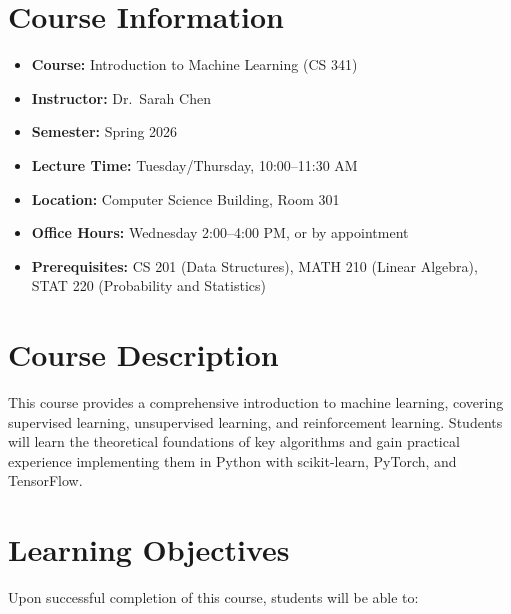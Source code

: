 \documentclass[
    language=english,
    doctype=curriculum,
    institution=none,
]{../../omnilatex}
\begin{document}
\maketitle

\section{Course Information}

\begin{itemize}
    \item \textbf{Course:} Introduction to Machine Learning (CS 341)
    \item \textbf{Instructor:} Dr.\ Sarah Chen
    \item \textbf{Semester:} Spring 2026
    \item \textbf{Lecture Time:} Tuesday/Thursday, 10:00--11:30 AM
    \item \textbf{Location:} Computer Science Building, Room 301
    \item \textbf{Office Hours:} Wednesday 2:00--4:00 PM, or by appointment
    \item \textbf{Prerequisites:} CS 201 (Data Structures), MATH 210 (Linear Algebra), STAT 220 (Probability and Statistics)
\end{itemize}

\section{Course Description}

This course provides a comprehensive introduction to machine learning, covering supervised learning, unsupervised learning, and reinforcement learning. Students will learn the theoretical foundations of key algorithms and gain practical experience implementing them in Python with scikit-learn, PyTorch, and TensorFlow.

\section{Learning Objectives}

Upon successful completion of this course, students will be able to:
\end{document}
